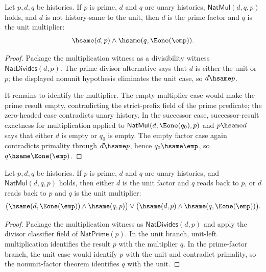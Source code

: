 \begin{theorem}
\label{thm:natprime-natmul-nonunit-factor-multiplier-unit}
Let $p,d,q$ be histories. If $p$ is prime, $d$ and $q$ are unary histories,
$\mathsf{NatMul}(d,q,p)$ holds, and $d$ is not history-same to the unit, then
$d$ is the prime factor and $q$ is the unit multiplier:
$$
\hsame(d,p)\wedge\hsame(q,\Eone(\emp)).
$$
\end{theorem}
\begin{proof}
Package the multiplication witness as a divisibility witness
$\mathsf{NatDivides}(d,p)$. The prime divisor alternative says that $d$ is
either the unit or $p$; the displayed nonunit hypothesis eliminates the unit
case, so $d\hsame p$.

It remains to identify the multiplier. The empty multiplier case would make
the prime result empty, contradicting the strict-prefix field of the prime
predicate; the zero-headed case contradicts unary history. In the successor
case, successor-result exactness for multiplication applied to
$\mathsf{NatMul}(d,\Eone(q_0),p)$ and $p\hsame d$ says that either $d$ is
empty or $q_0$ is empty. The empty factor case again contradicts primality
through $d\hsame p$, hence $q_0\hsame\emp$, so
$q\hsame\Eone(\emp)$.
\end{proof}

\begin{theorem}
\label{thm:prime-natmul-factor-unit-or-prime}
Let $p,d,q$ be histories. If $p$ is prime, $d$ and $q$ are unary histories, and
$\mathsf{NatMul}(d,q,p)$ holds, then either $d$ is the unit factor and $q$
reads back to $p$, or $d$ reads back to $p$ and $q$ is the unit multiplier:
$$
\bigl(\hsame(d,\Eone(\emp))\wedge\hsame(q,p)\bigr)\vee
\bigl(\hsame(d,p)\wedge\hsame(q,\Eone(\emp))\bigr).
$$
\end{theorem}
\begin{proof}
Package the multiplication witness as $\mathsf{NatDivides}(d,p)$ and apply the
divisor classifier field of $\mathsf{NatPrime}(p)$. In the unit branch,
unit-left multiplication identifies the result $p$ with the multiplier $q$. In
the prime-factor branch, the unit case would identify $p$ with the unit and
contradict primality, so the nonunit-factor theorem identifies $q$ with the
unit.
\end{proof}

